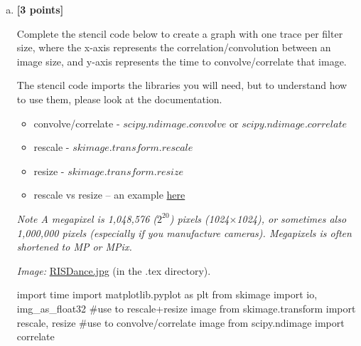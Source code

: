 \begin{enumerate}[(a)]
\item
    \textbf{[3 points]}
    \begin{tcolorbox}[colback=orange!5!white,colframe=orange!75!black]
    Complete the stencil code below to create a graph with one trace per filter size, where the x-axis represents the correlation/convolution between an image size, and y-axis represents the time to convolve/correlate that image.

    The stencil code imports the libraries you will need, but to understand how to use them, please look at the documentation.
    
    \begin{itemize}
    \item convolve/correlate - \href{https://docs.scipy.org/doc/scipy/reference/generated/scipy.ndimage.convolve.html}{$scipy.ndimage.convolve$} or \href{https://docs.scipy.org/doc/scipy/reference/generated/scipy.ndimage.correlate.html}{$scipy.ndimage.correlate$}
    \item rescale - \href{https://scikit-image.org/docs/dev/api/skimage.transform.html#skimage.transform.rescale}{$skimage.transform.rescale$}
    \item resize - \href{https://scikit-image.org/docs/dev/api/skimage.transform.html#skimage.transform.resize}{$skimage.transform.resize$}
    \item rescale vs resize – an example \href{http://scikit-image.org/docs/dev/auto_examples/transform/plot_rescale.html}{here}
    \end{itemize}
    
    \end{tcolorbox}

\emph{Note A megapixel is 1,048,576 ($2^{20}$) pixels (1024$\times$1024), or sometimes also 1,000,000 pixels (especially if you manufacture cameras). Megapixels is often shortened to MP or MPix.}

\emph{Image:} \href{RISDance.jpg}{RISDance.jpg} (in the .tex directory).

\begin{tcolorbox}[enhanced jigsaw,breakable,pad at break*=1mm,colback=white!5!white,colframe=green!75!black]
\begin{python}
import time
import matplotlib.pyplot as plt
from skimage import io, img_as_float32
#use to rescale+resize image
from skimage.transform import rescale, resize
#use to convolve/correlate image
from scipy.ndimage import correlate


\end{python}
\end{tcolorbox}
\end{enumerate}
